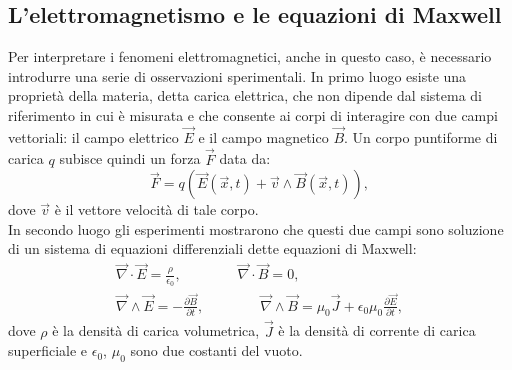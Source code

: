 \subsection{L'elettromagnetismo e le equazioni di Maxwell}\label{sec:EquazioniMaxwell}
Per interpretare i fenomeni elettromagnetici, anche in questo caso, è necessario introdurre
una serie di osservazioni sperimentali. In primo luogo esiste una proprietà della materia, 
detta carica elettrica, che non dipende dal sistema di riferimento in cui è misurata e che consente 
ai corpi di interagire con due campi vettoriali: 
il campo elettrico $\vec{E}$ e il campo magnetico $\vec{B}$. Un corpo puntiforme di carica 
$q$ subisce quindi un forza $\vec{F}$ data da:
\begin{equation}
	\vec{F}=q(\vec{E}(\vec{x},t)+\vec{v}\wedge\vec{B}(\vec{x},t)),
	\label{ForzaLorentz}
\end{equation}
dove $\vec{v}$ è il vettore velocità di tale corpo.\\
In secondo luogo gli esperimenti mostrarono che questi due campi sono soluzione di un sistema di equazioni differenziali dette equazioni di Maxwell:
\begin{equation}
	\begin{gathered}
		\vec{\nabla}\cdot\vec{E}=\frac{\rho}{\epsilon_0}, \qquad \qquad \vec{\nabla}\cdot\vec{B}=0, \\
		\vec{\nabla}\wedge\vec{E}=-\frac{\partial\vec{B}}{\partial t}, \qquad \qquad \vec{\nabla}\wedge
		\vec{B}=\mu_0\vec{J}+\epsilon_0\mu_0\frac{\partial\vec{E}}{\partial t},
		\label{EquazioniMaxwell}
	\end{gathered}
\end{equation}
dove $\rho$ è la densità di carica volumetrica, $\vec{J}$ è la densità di corrente di carica superficiale e 
$\epsilon_0$, $\mu_0$ sono due costanti del vuoto.\\

